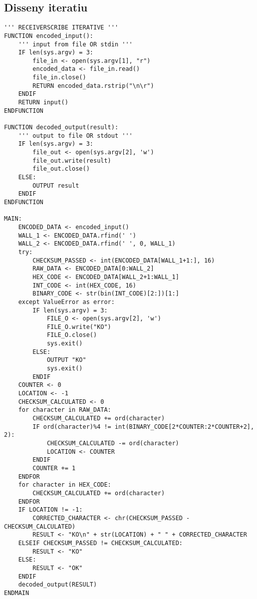 \documentclass{article}
\begin{document}
\subsection{Disseny iteratiu}
\begin{lstlisting}
''' RECEIVERSCRIBE ITERATIVE '''
FUNCTION encoded_input():
    ''' input from file OR stdin '''
    IF len(sys.argv) = 3:
        file_in <- open(sys.argv[1], "r")
        encoded_data <- file_in.read()
        file_in.close()
        RETURN encoded_data.rstrip("\n\r")
    ENDIF
    RETURN input()
ENDFUNCTION

FUNCTION decoded_output(result):
    ''' output to file OR stdout '''
    IF len(sys.argv) = 3:
        file_out <- open(sys.argv[2], 'w')
        file_out.write(result)
        file_out.close()
    ELSE:
        OUTPUT result
    ENDIF
ENDFUNCTION

MAIN:
    ENCODED_DATA <- encoded_input()
    WALL_1 <- ENCODED_DATA.rfind(' ')
    WALL_2 <- ENCODED_DATA.rfind(' ', 0, WALL_1)
    try:
        CHECKSUM_PASSED <- int(ENCODED_DATA[WALL_1+1:], 16)
        RAW_DATA <- ENCODED_DATA[0:WALL_2]
        HEX_CODE <- ENCODED_DATA[WALL_2+1:WALL_1]
        INT_CODE <- int(HEX_CODE, 16)
        BINARY_CODE <- str(bin(INT_CODE)[2:])[1:]
    except ValueError as error:
        IF len(sys.argv) = 3:
            FILE_O <- open(sys.argv[2], 'w')
            FILE_O.write("KO")
            FILE_O.close()
            sys.exit()
        ELSE:
            OUTPUT "KO"
            sys.exit()
        ENDIF
    COUNTER <- 0
    LOCATION <- -1
    CHECKSUM_CALCULATED <- 0
    for character in RAW_DATA:
        CHECKSUM_CALCULATED += ord(character)
        IF ord(character)%4 != int(BINARY_CODE[2*COUNTER:2*COUNTER+2], 2):
            CHECKSUM_CALCULATED -= ord(character)
            LOCATION <- COUNTER
        ENDIF
        COUNTER += 1
    ENDFOR
    for character in HEX_CODE:
        CHECKSUM_CALCULATED += ord(character)
    ENDFOR
    IF LOCATION != -1:
        CORRECTED_CHARACTER <- chr(CHECKSUM_PASSED - CHECKSUM_CALCULATED)
        RESULT <- "KO\n" + str(LOCATION) + " " + CORRECTED_CHARACTER
    ELSEIF CHECKSUM_PASSED != CHECKSUM_CALCULATED:
        RESULT <- "KO"
    ELSE:
        RESULT <- "OK"
    ENDIF
    decoded_output(RESULT)
ENDMAIN
\end{lstlisting}
\newpage
\end{document}

